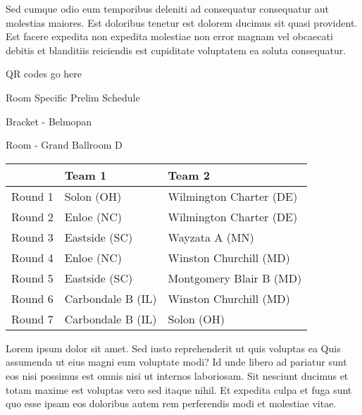 \documentclass{article}%
\begin{document}
\newline%
Sed cumque odio eum temporibus deleniti ad consequatur consequatur aut molestias maiores. Est doloribus tenetur est dolorem ducimus sit quasi provident. Est facere expedita non expedita molestiae non error magnam vel obcaecati debitis et blanditiis reiciendis est cupiditate voluptatem ea soluta consequatur.%
\vspace*{140pt}%
\begin{center}%
\begin{Huge}%
QR codes go here%
\end{Huge}%
\end{center}%
\newpage%
\begin{center}%
\begin{Huge}%
Room Specific Prelim Schedule%
\end{Huge}%
\vspace*{8pt}%
\linebreak%
\begin{Large}%
Bracket {-} Belmopan%
\end{Large}%
\vspace*{8pt}%
\linebreak%
\vspace*{8pt}%
\begin{Large}%
Room {-} Grand Ballroom D%
\end{Large}%
\end{center}%
%
\begin{tabularx}{\textwidth}{|c|Y|Y|}%
\hline%
&Team 1&Team 2\\%
\hline%
Round 1&Solon (OH)&Wilmington Charter (DE)\\%
Round 2&Enloe (NC)&Wilmington Charter (DE)\\%
Round 3&Eastside (SC)&Wayzata A (MN)\\%
Round 4&Enloe (NC)&Winston Churchill (MD)\\%
Round 5&Eastside (SC)&Montgomery Blair B (MD)\\%
Round 6&Carbondale B (IL)&Winston Churchill (MD)\\%
Round 7&Carbondale B (IL)&Solon (OH)\\%
\hline%
\end{tabularx}%
\vspace*{8pt}%
\newline%
Lorem ipsum dolor sit amet. Sed iusto reprehenderit ut quis voluptas ea Quis assumenda ut eius magni eum voluptate modi? Id unde libero ad pariatur sunt eos nisi possimus est omnis nisi ut internos laboriosam. Sit nesciunt ducimus et totam maxime est voluptas vero sed itaque nihil. Et expedita culpa et fuga sunt quo esse ipsam eos doloribus autem rem perferendis modi et molestiae vitae.\newline%
\end{document}
